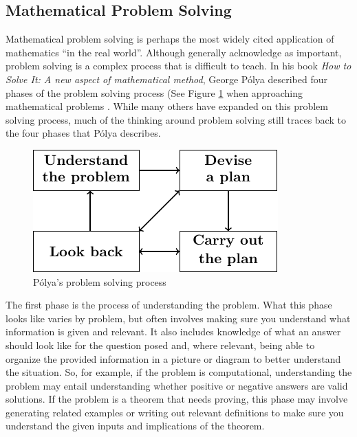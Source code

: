 \documentclass[
]{book}
\theoremstyle{definition}
\theoremstyle{definition}
\theoremstyle{definition}
\theoremstyle{remark}
\begin{document}
\hypertarget{mathematical-problem-solving}{%
\subsection{Mathematical Problem Solving}\label{mathematical-problem-solving}}

Mathematical problem solving is perhaps the most widely cited application of mathematics ``in the real world''. Although generally acknowledge as important, problem solving is a complex process that is difficult to teach. In his book \emph{How to Solve It: A new aspect of mathematical method}, George Pólya described four phases of the problem solving process (See Figure \ref{fig:polya} when approaching mathematical problems \citep{Polya1945}. While many others have expanded on this problem solving process, much of the thinking around problem solving still traces back to the four phases that Pólya describes.

\begin{figure}

{\centering \includegraphics[width=0.45\linewidth]{tikz/polya} 

}

\caption{Pólya's problem solving process}\label{fig:polya}
\end{figure}

The first phase is the process of understanding the problem. What this phase looks like varies by problem, but often involves making sure you understand what information is given and relevant. It also includes knowledge of what an answer should look like for the question posed and, where relevant, being able to organize the provided information in a picture or diagram to better understand the situation. So, for example, if the problem is computational, understanding the problem may entail understanding whether positive or negative answers are valid solutions. If the problem is a theorem that needs proving, this phase may involve generating related examples or writing out relevant definitions to make sure you understand the given inputs and implications of the theorem.
\end{document}
